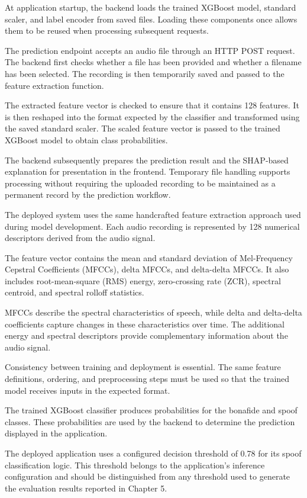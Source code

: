 \documentclass[12pt,a4paper]{report}
\begin{document}
At application startup, the backend loads the trained XGBoost
model, standard scaler, and label encoder from saved files.
Loading these components once allows them to be reused when
processing subsequent requests.

The prediction endpoint accepts an audio file through an HTTP
POST request. The backend first checks whether a file has been
provided and whether a filename has been selected. The recording
is then temporarily saved and passed to the feature extraction
function.

The extracted feature vector is checked to ensure that it
contains 128 features. It is then reshaped into the format
expected by the classifier and transformed using the saved
standard scaler. The scaled feature vector is passed to the
trained XGBoost model to obtain class probabilities.

The backend subsequently prepares the prediction result and
the SHAP-based explanation for presentation in the frontend.
Temporary file handling supports processing without requiring
the uploaded recording to be maintained as a permanent record
by the prediction workflow.

The deployed system uses the same handcrafted feature extraction
approach used during model development. Each audio recording is
represented by 128 numerical descriptors derived from the
audio signal.

The feature vector contains the mean and standard deviation
of Mel-Frequency Cepstral Coefficients (MFCCs), delta MFCCs,
and delta-delta MFCCs. It also includes root-mean-square (RMS)
energy, zero-crossing rate (ZCR), spectral centroid, and
spectral rolloff statistics.

MFCCs describe the spectral characteristics of speech, while
delta and delta-delta coefficients capture changes in these
characteristics over time. The additional energy and spectral
descriptors provide complementary information about the audio
signal.

Consistency between training and deployment is essential.
The same feature definitions, ordering, and preprocessing
steps must be used so that the trained model receives inputs
in the expected format.

The trained XGBoost classifier produces probabilities for the
bonafide and spoof classes. These probabilities are used by
the backend to determine the prediction displayed in the
application.

The deployed application uses a configured decision threshold
of 0.78 for its spoof classification logic. This threshold
belongs to the application's inference configuration and
should be distinguished from any threshold used to generate
the evaluation results reported in Chapter 5.
\end{document}
